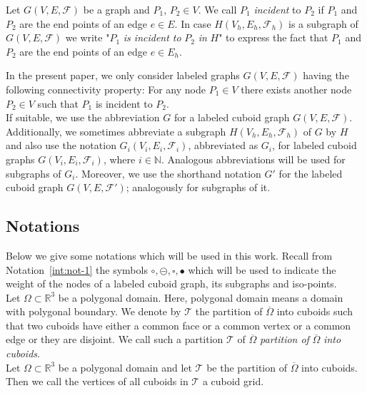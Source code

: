 \documentclass[a4paper,11pt]{article}
\begin{document}
Let $G(V,E,\mathcal{F})$ be a graph and $P_1$, $P_2\in V$. We call $P_1$ {\it incident} to $P_2$
if $P_1$ and $P_2$ are the end points of an edge $e\in E$. In case $H(V_h,E_h,\mathcal{F}_h)$ is
a subgraph of $G(V,E,\mathcal{F})$ we write "$P_1$ {\it is incident to} $P_2$ {\it in} $H$" to
express the fact that $P_1$ and $P_2$ are the end points of an edge $e\in E_h$.

In the present paper, we only consider labeled graphs $G(V,E,\mathcal{F})$ having the following
connectivity property: For any node $P_1\in V$ there exists another node $P_2\in V$ such
that $P_1$ is incident to $P_2$. \\

If suitable, we use the abbreviation $G$ for a labeled cuboid graph
$G(V,E,\mathcal{F})$. Additionally, we sometimes abbreviate a subgraph $H(V_h,E_h,\mathcal{F}_h)$
of $G$ by $H$ and also use the notation $G_i(V_i,E_i,\mathcal{F}_i)$, abbreviated as $G_i$, for
labeled cuboid graphs $G(V_i,E_i,\mathcal{F}_i)$, where $i\in\mathbb{N}$. Analogous abbreviations
will be used for subgraphs of $G_i$. Moreover, we use the shorthand notation $G'$ for the labeled
cuboid graph $G(V,E,\mathcal{F}')$; analogously for subgraphs of it.

\subsection{Notations}
Below we give some notations which will be used in this work. Recall from Notation~\ref{int:not-1}
the symbols $\circ,\circleddash,\square,\bullet$ which will be used to indicate the weight of the
nodes of a labeled cuboid graph, its subgraphs and iso-points.\\

Let $\Omega\subset\mathbb{R}^3$ be a polygonal domain.
Here, polygonal domain means a domain with polygonal boundary. We denote by $\mathcal{T}$ the partition
of $\overline{\Omega}$ into cuboids such that two cuboids have either a common face or a common
vertex or a common edge or they are disjoint. We call such a partition $\mathcal{T}$ of $\overline{\Omega}$
{\it partition of} $\overline{\Omega}$ {\it into cuboids}.\\

Let $\Omega\subset\mathbb{R}^3$ be a polygonal domain and let $\mathcal{T}$
be the partition of $\overline{\Omega}$ into cuboids. Then we call the vertices of all cuboids in
$\mathcal{T}$ a cuboid grid.\\
\end{document}
